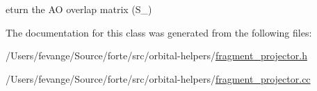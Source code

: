 eturn the AO overlap matrix (S\+\_\+) 



The documentation for this class was generated from the following files\+:\begin{DoxyCompactItemize}
\item 
/\+Users/fevange/\+Source/forte/src/orbital-\/helpers/\mbox{\hyperlink{fragment__projector_8h}{fragment\+\_\+projector.\+h}}\item 
/\+Users/fevange/\+Source/forte/src/orbital-\/helpers/\mbox{\hyperlink{fragment__projector_8cc}{fragment\+\_\+projector.\+cc}}\end{DoxyCompactItemize}
